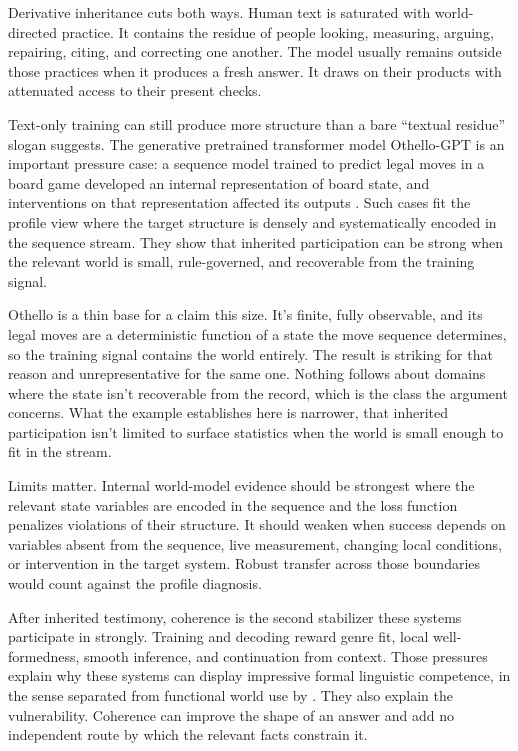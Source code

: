 \documentclass[12pt]{article}
\begin{document}
Derivative inheritance cuts both ways. Human text is saturated with world-directed
practice. It contains the residue of people looking, measuring, arguing, repairing,
citing, and correcting one another. The model usually remains outside those practices
when it produces a fresh answer. It draws on their products with attenuated access to
their present checks.

Text-only training can still produce more structure than a bare \enquote{textual
residue} slogan suggests. The generative pretrained transformer model Othello-GPT is an
important pressure case: a sequence model trained to predict legal moves in a board game
developed an internal representation of board state, and interventions on that
representation affected its outputs \citep{li_etal_2023_emergent_world_representations}.
Such cases fit the profile view where the target structure is densely and systematically
encoded in the sequence stream. They show that inherited
participation can be strong when the relevant world is small, rule-governed, and
recoverable from the training signal.

Othello is a thin base for a claim this size. It's finite, fully observable, and its legal moves are a deterministic function
of a state the move sequence determines, so the training signal contains the world
entirely. The result is striking for that reason and unrepresentative for the same one.
Nothing follows about domains where the state isn't recoverable from the record, which is
the class the argument concerns. What the example establishes here is
narrower, that inherited participation isn't limited to surface statistics when the world
is small enough to fit in the stream.

Limits matter. Internal world-model evidence should be strongest where the relevant
state variables are encoded in the sequence and the loss function penalizes violations
of their structure. It should weaken when success depends on variables absent from the
sequence, live measurement, changing local conditions, or intervention in the target
system. Robust transfer across those boundaries would count against the profile
diagnosis.

After inherited testimony, coherence is the second stabilizer these systems participate
in strongly. Training and decoding reward genre fit,
local well-formedness, smooth inference, and continuation from context. Those
pressures explain why these systems can display impressive formal linguistic competence,
in the sense separated from functional world use by \textcite{mahowald2024}. They also
explain the vulnerability. Coherence can improve the shape of an answer and add no
independent route by which the relevant facts constrain it.
\end{document}
